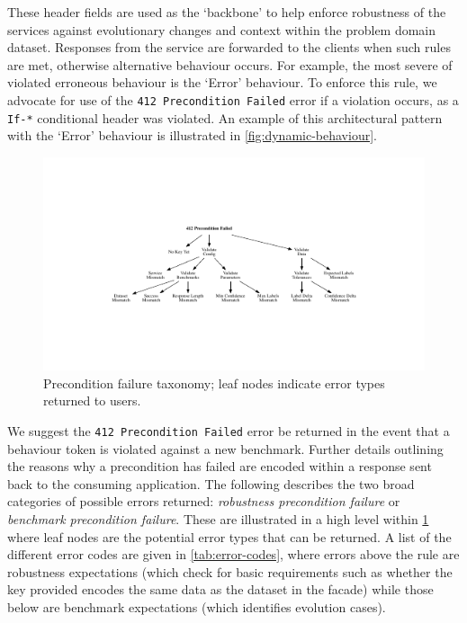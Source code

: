 These  header fields are used as the `backbone' to help enforce robustness of the services against evolutionary changes and context within the problem domain dataset. Responses from the service are forwarded to the clients when such rules are met, otherwise alternative behaviour occurs. For example, the most severe of violated erroneous behaviour is the `Error' behaviour. To enforce this rule, we advocate for use of the \texttt{412 Precondition Failed}  error if a violation occurs, as a \texttt{If-*} conditional header was violated. An example of this architectural pattern with the `Error' behaviour is illustrated in \cref{fig:dynamic-behaviour}. 

\begin{figure}[t]
    \centering
    \includegraphics[width=\linewidth]{precondition-failed}
    \caption{Precondition failure taxonomy; leaf nodes indicate error types returned to users.}
    \label{fig:precondition-failed}
\end{figure}

We suggest the \texttt{412 Precondition Failed}  error be returned in the event that a behaviour token is violated against a new benchmark. Further details outlining the reasons why a precondition has failed are encoded within a  response sent back to the consuming application. The following describes the two broad categories of possible errors returned: \textit{robustness precondition failure} or \textit{benchmark precondition failure}. These are illustrated in a high level within \cref{fig:precondition-failed} where leaf nodes are the potential error types that can be returned. A list of the different error codes are given in \cref{tab:error-codes}, where errors above the rule are robustness expectations (which check for basic requirements such as whether the key provided encodes the same data as the dataset in the facade) while those below are benchmark expectations (which identifies evolution cases).

